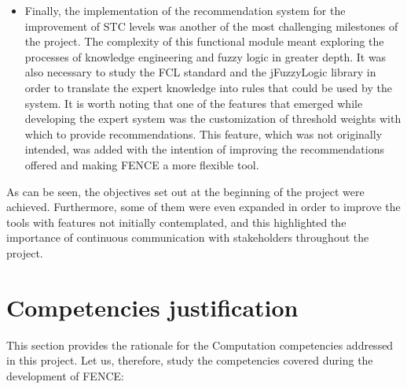 \begin{itemize}
\item Finally, the implementation of the recommendation system for the improvement of STC levels was another of the most challenging milestones of the project. The complexity of this functional module meant exploring the processes of knowledge engineering and fuzzy logic in greater depth. It was also necessary to study the FCL standard and the jFuzzyLogic library in order to translate the expert knowledge into rules that could be used by the system. It is worth noting that one of the features that emerged while developing the expert system was the customization of threshold weights with which to provide recommendations. This feature, which was not originally intended, was added with the intention of improving the recommendations offered and making FENCE a more flexible tool.

\end{itemize}

As can be seen, the objectives set out at the beginning of the project were achieved. Furthermore, some of them were even expanded in order to improve the tools with features not initially contemplated, and this highlighted the importance of continuous communication with stakeholders throughout the project.

\section{Competencies justification}

This section provides the rationale for the Computation competencies addressed in this project. Let us, therefore, study the competencies covered during the development of FENCE:


